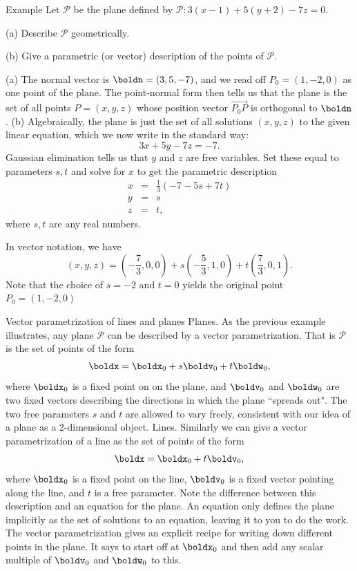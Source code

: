 \begin{frame}{Example}
Let $\mathcal{P}$ be the plane defined by $\mathcal{P}: 3(x-1)+5(y+2)-7z=0$. 

(a) Describe $\mathcal{P}$ geometrically. 

(b) Give a parametric (or vector) description of the points of $\mathcal{P}$.
\begin{bsolution}
\scriptsize
(a) The normal vector is $\boldn=(3,5,-7)$, and we read off $P_0=(1,-2,0)$ as one point of the plane. The point-normal form then tells us that the plane is the set of all points $P=(x,y,z)$ whose position vector $\overrightarrow{P_0P}$ is orthogonal to $\boldn$. 
\bpause
(b)  Algebraically, the plane is just the set of all solutions $(x,y,z)$ to the given linear equation, which we now write in the standard way:
\[
3x+5y-7z=-7.
\]
Gaussian elimination tells us that $y$ and $z$ are free variables. Set these equal to parameters $s, t$ and solve for $x$ to get the parametric description 
\begin{eqnarray*}
x&=&\frac{1}{3}(-7-5s+7t)\\
y&=&s\\
z&=&t,
\end{eqnarray*}
where $s,t$ are any real numbers. 

In vector notation, we have 
\[
(x,y,z)=(-\frac{7}{3},0,0)+s(-\frac{5}{3},1,0)+t(\frac{7}{3},0,1).
\]
Note that the choice of $s=-2$ and $t=0$ yields the original point $P_0=(1,-2,0)$ 
\end{bsolution}
\end{frame}
\begin{frame}{Vector parametrization of lines and planes}
\alert{Planes}. As the previous example illustrates, any plane $\mathcal{P}$ can be described by a vector parametrization. That is $\mathcal{P}$ is the set of points of the form 
\[
\boldx=\boldx_0+s\boldv_0+t\boldw_0,
\]
where $\boldx_0$ is a fixed point on on the plane, and $\boldv_0$ and $\boldw_0$ are two fixed vectors describing the directions in which the plane ``spreads out". The \alert{two} free parameters $s$ and $t$ are allowed to vary freely, consistent with our idea of a plane as a \alert{2-dimensional} object. 
\bpause
\alert{Lines}. Similarly we can give a vector parametrization of a line as the set of points of the form 
\[
\boldx=\boldx_0+t\boldv_0,
\]
where $\boldx_0$ is a fixed point on the line, $\boldv_0$ is a fixed vector pointing along the line, and $t$ is a free parameter. 
\bpause 
Note the difference between this description and an equation for the plane. 
\bspace
An equation only defines the plane \alert{implicitly} as the set of solutions to an equation, leaving it to you to do the work. 
\bpause 
The vector parametrization gives an \alert{explicit} recipe for writing down different points in the plane. It says to start off at $\boldx_0$ and then add any scalar multiple of $\boldv_0$ and $\boldw_0$ to this. 
\end{frame}
